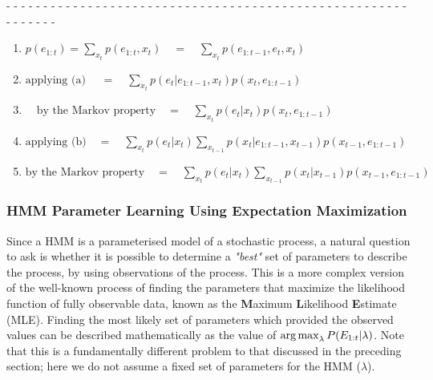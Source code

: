 \begin{center}
- - - - - - - - - - - - - - - - - - - - - - - - - - - - - - - - - - - - - - - - - - - - - - - - - - - - - - - - - - - - - 
\end{center}


\begin{enumerate}

\item {\hfil $p(e_{1:t}) = \sum_{x_t}p(e_{1:t}, x_t) \quad = \quad \sum_{x_t}p({e_{1:t-1}, e_t, x_t}) $
}
\item {\hfil $\text{applying (a) } \quad= \quad
\sum_{x_t}{p(e_t | e_{1:t-1}, x_t)p(x_t, e_{1:t-1})}$
}
\item {\hfil $\quad \text{by the Markov property} 
\quad = \quad \sum_{x_t}p(e_t | x_t)p(x_t, e_{1:t-1})$
}

\item {\hfil $\text{applying (b)} \quad =  \quad
\sum_{x_t}p(e_t | x_t) \sum_{x_{t-1}}p(x_t|e_{1:t-1}, x_{t-1}) p(x_{t-1},e_{1:t-1})$
}

\item {\hfil $\text{by the Markov property} \quad = \quad 
\sum_{x_t}{p(e_t | x_t)\sum_{x_{t-1}}p(x_t|x_{t-1}) p(x_{t-1},e_{1:t-1})}$
}

\end{enumerate}


\subsubsection{HMM Parameter Learning Using Expectation Maximization}
Since a HMM is a parameterised model of a stochastic process, a natural question to ask is whether it is possible to determine a \textit{"best"} set of parameters to describe the process, by using observations of the process. This is a more complex version of the well-known process of finding the parameters that maximize the likelihood function of fully observable data, known as the \textbf{M}aximum \textbf{L}ikelihood \textbf{E}stimate (MLE). Finding the most likely set of parameters which provided the observed values can be described mathematically as the value of $\operatorname*{arg\,max}_{\lambda} P(E_{1:t} | \lambda)$. Note that this is a fundamentally different problem to that discussed in the preceding section; here we do not assume a fixed set of parameters for the HMM ($\lambda$).


